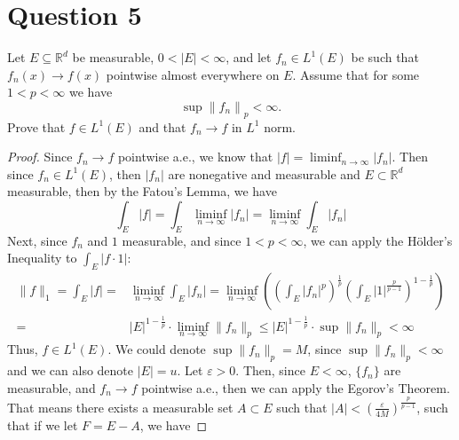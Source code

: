 \section{Question 5}

\begin{question}
    [15 points] Let $E \subseteq \mathbb{R}^d$ be measurable, $0<|E|<\infty$, and let $f_n \in L^1(E)$ be such that $f_n(x) \rightarrow f(x)$ pointwise almost everywhere on $E$. Assume that for some $1<p<\infty$ we have
    $$
    \sup \left\|f_n\right\|_p<\infty .
    $$
    Prove that $f \in L^1(E)$ and that $f_n \rightarrow f$ in $L^1$ norm.
\end{question}

\begin{answer}
    \begin{proof}
        Since $f_n \to f$ pointwise a.e., we know that $\lvert f \rvert = \liminf_{n \to \infty} \lvert f_n \rvert$. Then since $f_n \in L^1(E)$, then $\lvert f_n \rvert$ are nonegative and measurable and $E \subset \mathbb{R}^d$ measurable, then by the Fatou's Lemma, we have
        \begin{equation}
            \int_{E} \lvert f \rvert = \int_E \liminf_{n \to \infty} \lvert f_n \rvert = \liminf_{n \to \infty} \int_E \lvert f_n \rvert
        \end{equation}
        Next, since $f_n$ and $1$ measurable, and since $1 < p < \infty$, we can apply the Hölder's Inequality to $\int_E \lvert f \cdot 1 \rvert$:
        \begin{equation}
            \begin{aligned}
                \lVert f \rVert_1 = \int_{E} \lvert f \rvert = &\liminf_{n \to \infty} \int_E \lvert f_n \rvert = \liminf_{n \to \infty} \left(\left(\int_E \lvert f_n \rvert^p\right)^{\frac{1}{p}}\left(\int_E \lvert 1 \rvert^{\frac{p}{p-1}}\right)^{1-\frac{1}{p}}\right)\\
                = &\lvert E \rvert^{1-\frac{1}{p}} \cdot \liminf_{n \to \infty} \lVert f_n \rVert_p \leq \lvert E \rvert^{1-\frac{1}{p}} \cdot \sup \lVert f_n \rVert_p < \infty
            \end{aligned}
        \end{equation}
        Thus, $f \in L^1(E)$. We could  denote $\sup \lVert f_n \rVert_p = M$, since $\sup \lVert f_n \rVert_p < \infty$ and we can also denote $\lvert E \rvert = u$. Let $\varepsilon > 0$. Then, since $E < \infty$, $\{f_n\}$ are measurable, and $f_n \to f$ pointwise a.e., then we can apply the Egorov's Theorem. That means there exists a measurable set $A \subset E$ such that $\lvert A \rvert < \left(\tfrac{\varepsilon}{4M}\right)^{\frac{p}{p-1}}$, such that if we let $F = E - A$, we have

\end{proof}
\end{answer}
